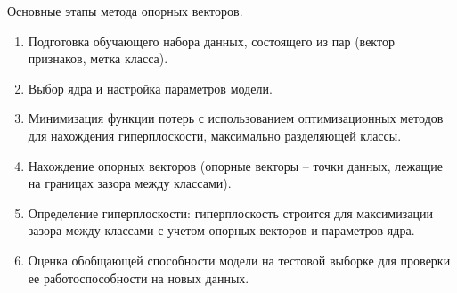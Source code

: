 Основные этапы метода опорных векторов.
\begin{enumerate}[label=\arabic*.]
	\item Подготовка обучающего набора данных, состоящего из пар (вектор признаков, метка класса).
	\item Выбор ядра и настройка параметров модели.
	\item Минимизация функции потерь с использованием оптимизационных методов для нахождения гиперплоскости, максимально разделяющей классы.
	\item Нахождение опорных векторов (опорные векторы -- точки данных, лежащие на границах зазора между классами).
	\item Определение гиперплоскости: гиперплоскость строится для максимизации зазора между классами с учетом опорных векторов и параметров ядра.
	\item Оценка обобщающей способности модели на тестовой выборке для проверки ее работоспособности на новых данных.
\end{enumerate}
